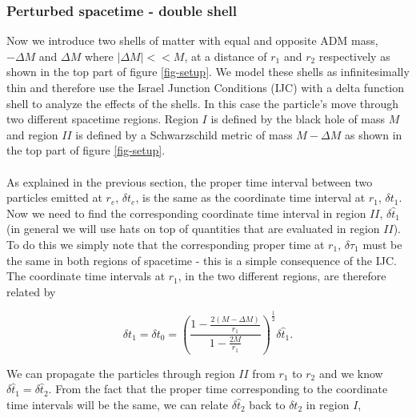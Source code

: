 \documentclass[aps,showpacs,twocolumn,floats,prd,superscriptaddress,nofootinbib]{revtex4-1}
\begin{document}
%
%

\subsubsection{Perturbed spacetime - double shell}

Now we introduce two shells of matter with equal and opposite ADM mass, $-\Delta M$ and $\Delta M$ where $|\Delta M|<<M$, at a distance of $r_1$ and $r_2$ respectively as shown in the top part of figure \ref{fig-setup}. We model these shells as infinitesimally thin and therefore use the Israel Junction Conditions (IJC) \cite{Isr66} with a delta function shell to analyze the effects of the shells. In this case the particle's move through two different spacetime regions. Region $I$ is defined by the black hole of mass $M$ and region $II$ is defined by a Schwarzschild metric of mass $M-\Delta M$ as shown in the top part of figure \ref{fig-setup}.
\\
\\
As explained in the previous section, the proper time interval between two particles emitted at $r_e$, $\delta t_e$, is the same as the coordinate time interval at $r_1$, $\delta t_1$. Now we need to find the corresponding coordinate time interval in region $II$, $\delta \hat{t}_1$ (in general we will use hats on top of quantities that are evaluated in region $II$). To do this we simply note that the corresponding proper time at $r_1$, $\delta \tau_1$ must be the same in both regions of spacetime - this is a simple consequence of the IJC. The coordinate time intervals at $r_1$, in the two different regions, are therefore related by

\begin{equation}
	\delta t_1 = \delta t_0 = \left( \frac{1 - \frac{2(M - \Delta M)}{r_1}}{1 - \frac{2M}{r_1}} \right)^\frac{1}{2} \delta \hat{t}_1.
\end{equation}

We can propagate the particles through region $II$ from $r_1$ to $r_2$ and we know $\delta \hat{t}_1 = \delta \hat{t}_2$. From the fact that the proper time corresponding to the coordinate time intervals will be the same, we can relate $\delta \hat{t}_2$ back to $\delta t_2$ in region $I$, 
\end{document}
